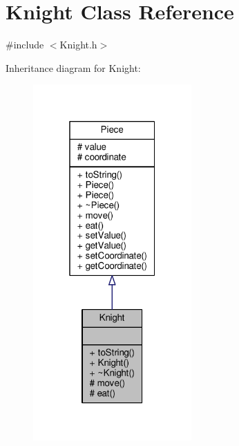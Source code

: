 \hypertarget{class_knight}{}\section{Knight Class Reference}
\label{class_knight}


{\ttfamily \#include $<$Knight.\+h$>$}



Inheritance diagram for Knight\+:\nopagebreak
\begin{figure}[H]
\begin{center}
\leavevmode
\includegraphics[width=172pt]{class_knight__inherit__graph}
\end{center}
\end{figure}


